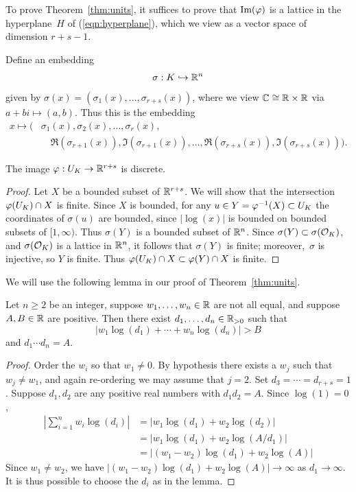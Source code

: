 To prove Theorem~\ref{thm:units}, it suffices to prove that
$\text{Im}(\varphi)$ is a lattice in the hyperplane~$H$ of
(\ref{eqn:hyperplane}), which we view as a vector space of dimension
$r+s-1$.

Define an embedding
\begin{equation}\label{eqn:sigma3}
 \sigma : K\hookrightarrow \mathbb{R}^n
\end{equation}
given by $\sigma(x) = (\sigma_1(x),\ldots,\sigma_{r+s}(x))$,
where we view $\mathbb{C}\cong \mathbb{R}\times \mathbb{R}$ via $a+b i\mapsto (a,b)$.
Thus this is the embedding
\begin{align*}
 x\mapsto \big(&\sigma_1(x), \sigma_2(x),\ldots, \sigma_r(x),\\
     &\quad \Re(\sigma_{r+1}(x)), \Im(\sigma_{r+1}(x)),
    \ldots, \Re(\sigma_{r+s}(x)), \Im(\sigma_{r+s}(x))\big).
\end{align*}

\begin{lemma}\label{lem:ukdiscrete}
The image $\varphi:U_K\to \mathbb{R}^{r+s}$ is discrete.
\end{lemma}
\begin{proof}
Let $X$ be a bounded subset of $\mathbb{R}^{r+s}$.
We will show that the intersection $\varphi(U_K)\cap X$ is finite.
Since $X$ is bounded, for any $u\in
Y=\varphi^{-1}(X)\subset U_K$ the coordinates of $\sigma(u)$ are bounded,
since $|\log(x)|$ is bounded on bounded subsets
of $[1,\infty)$.
Thus $\sigma(Y)$ is
a bounded subset of $\mathbb{R}^n$.  Since $\sigma(Y)\subset \sigma(\mathcal{O}_K)$,
and $\sigma(\mathcal{O}_K)$ is a lattice in $\mathbb{R}^n$, it follows that $\sigma(Y)$
is finite; moreover,~$\sigma$ is injective, so $Y$ is finite.
Thus $\varphi(U_K)\cap X \subset \varphi(Y) \cap X$ is finite.
\end{proof}

We will use the following lemma in our
proof of Theorem~\ref{thm:units}.
\begin{lemma}\label{lem:chooseci}
Let $n\geq 2$ be an integer, suppose $w_1,\ldots, w_n\in\mathbb{R}$
are not all equal, and suppose $A, B\in\mathbb{R}$ are positive. Then
there exist $d_1,\ldots, d_{n} \in \mathbb{R}_{>0}$ such that
$$|w_1\log(d_1)+\cdots +w_{n}\log(d_{n})| > B$$
and $d_1\cdots d_n = A$.
\end{lemma}
\begin{proof}
Order the $w_i$ so
that $w_1\neq 0$.  By hypothesis there exists a $w_j$ such that
$w_j\neq w_1$, and again re-ordering we may assume that $j=2$.  Set
$d_3=\cdots=d_{r+s}=1$.  Suppose $d_1, d_2$ are any positive real numbers
with  $d_1 d_2 = A$.  Since $\log(1)=0$,
\begin{align*}
  \left|\sum_{i=1}^{n} w_i \log(d_i)\right|
  &= |w_1\log(d_1) + w_2\log(d_2)|\\
  &= |w_1 \log(d_1) + w_2\log(A/d_1)| \\
  &= |(w_1-w_2)\log(d_1) + w_2\log(A)|
\end{align*}
Since $w_1\neq w_2$,  we have $|(w_1-w_2)\log(d_1) + w_2\log(A)|\to\infty$
as $d_1\to \infty$.  It is thus possible to choose the $d_i$ as in the lemma.
\end{proof}

